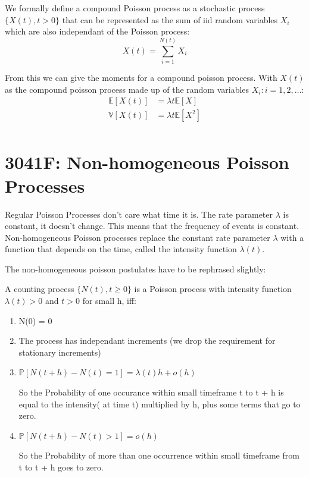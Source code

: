 \documentclass[12pt]{article}
\begin{document}
We formally define a compound Poisson process as a stochastic 
process \(\{X(t), t > 0\}\) that can be represented as the sum of iid random variables \(X_i\) which are also independant of the Poisson process:
\begin{equation*}
    X(t) = \sum_{i = 1}^{N(t)} X_i
\end{equation*}

From this we can give the moments for a compound poisson process. With \(X(t)\) as the 
compound poisson process made up of the random variables \(X_i: i=1, 2, \dots\):
\begin{equation*}
    \begin{aligned}
        \mathbb{E}[X(t)] &= \lambda t \mathbb{E}[X]   \\
        \mathbb{V}[X(t)] &= \lambda t \mathbb{E}[X^2] \\
    \end{aligned}
\end{equation*}
\section{3041F: Non-homogeneous Poisson Processes}
Regular Poisson Processes don't care what time it is. 
The rate parameter \(\lambda\) is constant, it doesn't change. This means that the frequency of events is constant.
Non-homogeneous Poisson processes replace the constant rate parameter \(\lambda\) with a function that depends on the time, called the intensity function \(\lambda(t)\).

The non-homogeneous poisson postulates have to be rephrased slightly:

A counting process \(\{N(t), t \ge 0\}\) is a Poisson process with intensity function
\( \lambda(t) > 0 \) and \(t > 0 \) for small h, iff:
\begin{enumerate}
    \item N(0) = 0
    \item The process has independant increments (we drop the requirement for stationary increments)
    \item \(\mathbb{P}[N(t + h) - N(t) = 1] = \lambda(t) h + o(h)\)

        So the Probability of one occurance within small timeframe t to t + h is equal to the intensity( at time t) multiplied by h, plus some terms that go to zero.
    \item \(\mathbb{P}[N(t + h) - N(t) > 1] = o(h)\)

        So the Probability of more than one occurrence within small timeframe from t to t + h goes to zero.
\end{enumerate}
\end{document}
